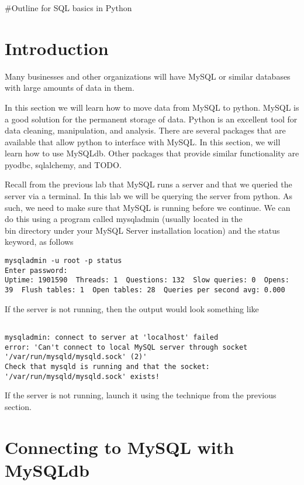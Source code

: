 #Outline for SQL basics in Python
\label{lab:DbPython}

\section*{Introduction}
Many businesses and other organizations will have MySQL or similar databases with large amounts of data in them.  

In this section we will learn how to move data from MySQL to python.  MySQL is a good solution for the permanent storage of data.  Python is an excellent tool for data cleaning, manipulation, and analysis.   There are several packages that are available that allow python to interface with MySQL.  In this section, we will learn how to use MySQLdb.  Other packages that provide similar functionality are pyodbc, sqlalchemy, and TODO.

Recall from the previous lab that MySQL runs a server and that we queried the server via a terminal.  In this lab we will be querying the server from python.  As such, we need to make sure that MySQL is running before we continue.  We can do this using a program called mysqladmin (usually located in the \\bin directory under your MySQL Server installation location) and the status keyword, as follows

\begin{lstlisting}[style=ShellInput]
mysqladmin -u root -p status
Enter password: 
Uptime: 1901590  Threads: 1  Questions: 132  Slow queries: 0  Opens: 39  Flush tables: 1  Open tables: 28  Queries per second avg: 0.000
\end{lstlisting}

If the server is not running, then the output would look something like

\begin{lstlisting}[style=ShellInput]

mysqladmin: connect to server at 'localhost' failed
error: 'Can't connect to local MySQL server through socket '/var/run/mysqld/mysqld.sock' (2)'
Check that mysqld is running and that the socket: '/var/run/mysqld/mysqld.sock' exists!

\end{lstlisting}

If the server is not running, launch it using the technique from the previous section.

\section{Connecting to MySQL with MySQLdb}

